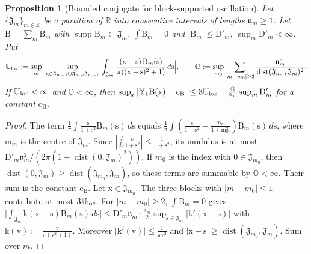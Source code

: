 \documentclass[11pt,reqno]{amsart}
\numberwithin{equation}{section}
\theoremstyle{plain}
\newtheorem{proposition}[theorem]{Proposition}
\theoremstyle{definition}
\theoremstyle{remark}
\begin{document}
\begin{proposition}[Bounded conjugate for block-supported oscillation]\label{prop:rb-variable-blocks}
Let $\{\mathfrak J_m\}_{m\in\mathbb Z}$ be a partition of $\mathbb R$ into consecutive intervals of lengths $\mathfrak n_m\ge1$. Let $\mathrm B=\sum_m\mathrm B_m$ with $\operatorname{supp}\mathrm B_m\subset \mathfrak J_m$, $\int \mathrm B_m=0$ and $|\mathrm B_m|\le \mathrm D'_m$, $\sup_m\mathrm D'_m<\infty$. Put
\begin{equation}\label{eq:rb-L0}
 \mathbb U_{\rm loc}:=\sup_m\ \sup_{\mathrm x\in \mathfrak J_{m-1}\cup \mathfrak J_m\cup \mathfrak J_{m+1}}\Bigl|\int_{\mathfrak J_m}\frac{(\mathrm x-\mathrm s)\,\mathrm B_m(\mathrm s)}{\pi((\mathrm x-\mathrm s)^2+1)}\,d\mathrm s\Bigr|,\qquad
 \mathbb O:=\sup_{m_0}\sum_{|m-m_0|\ge2}\frac{\mathfrak n_m^2}{\operatorname{dist}(\mathfrak J_{m_0},\mathfrak J_m)^2}.
\end{equation}
If $\mathbb U_{\rm loc}<\infty$ and $\mathbb O<\infty$, then $\sup_x|\mathbb Y_1\mathrm B(\mathrm x)-\mathrm c_{\mathrm B}|\le3\mathbb U_{\rm loc}+\frac{\mathbb O}{2\pi}\sup_m\mathrm D'_m$ for a constant $\mathrm c_{\mathrm B}$.
\end{proposition}

\begin{proof}
The term $\frac1\pi\int\frac{\mathrm s}{1+\mathrm s^2}\mathrm B_m(\mathrm s)\,d\mathrm s$ equals $\frac1\pi\int(\frac{\mathrm s}{1+\mathrm s^2}-\frac{\mathrm m_m}{1+\mathrm m_m^2})\mathrm B_m(\mathrm s)\,d\mathrm s$, where $\mathrm m_m$ is the centre of $\mathfrak J_m$. Since $|\frac d{d\mathrm s}\frac{\mathrm s}{1+\mathrm s^2}|\le\frac1{1+\mathrm s^2}$, its modulus is at most $\mathrm D'_m\mathfrak n_m^2/(2\pi(1+\operatorname{dist}(0,\mathfrak J_m)^2))$. If $m_0$ is the index with $0\in \mathfrak J_{m_0}$, then $\operatorname{dist}(0,\mathfrak J_m)\ge\operatorname{dist}(\mathfrak J_{m_0},\mathfrak J_m)$, so these terms are summable by $\mathbb O<\infty$. Their sum is the constant $\mathrm c_{\mathrm B}$. Let $\mathrm x\in \mathfrak J_{m_0}$. The three blocks with $|m-m_0|\le1$ contribute at most $3\mathbb U_{\rm loc}$. For $|m-m_0|\ge2$, $\int \mathrm B_m=0$ gives $\bigl|\int_{\mathfrak J_m}\mathrm k(\mathrm x-\mathrm s)\mathrm B_m(\mathrm s)\,d\mathrm s\bigr|\le \mathrm D'_m\mathfrak n_m\cdot\frac{\mathfrak n_m}2\sup_{\mathrm s\in \mathfrak J_m}|\mathrm k'(\mathrm x-\mathrm s)|$ with $\mathrm k(\mathrm v):=\frac{\mathrm v}{\pi(\mathrm v^2+1)}$. Moreover $|\mathrm k'(\mathrm v)|\le\frac1{\pi\mathrm v^2}$ and $|\mathrm x-\mathrm s|\ge\operatorname{dist}(\mathfrak J_{m_0},\mathfrak J_m)$. Sum over $m$.
\end{proof}
\end{document}
